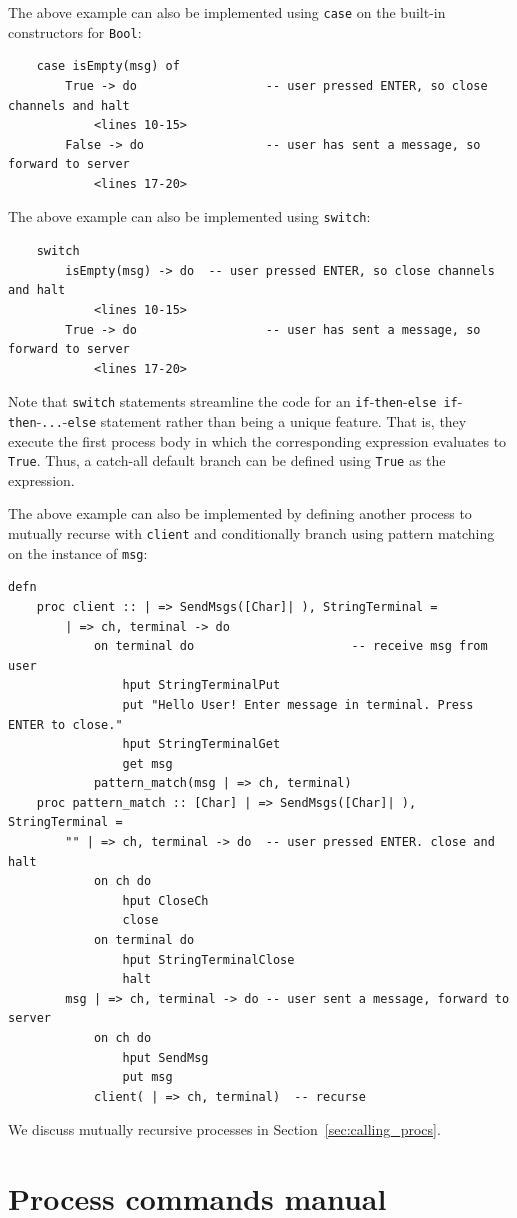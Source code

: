 \documentclass[acmsmall]{acmart}
\begin{document}
The above example can also be implemented using \lstinline$case$ on the built-in constructors for \lstinline{Bool}:
\begin{lstlisting}
	case isEmpty(msg) of
		True -> do					-- user pressed ENTER, so close channels and halt
			<lines 10-15>
		False -> do					-- user has sent a message, so forward to server
			<lines 17-20>
\end{lstlisting}

The above example can also be implemented using \lstinline$switch$:\begin{lstlisting}
	switch
		isEmpty(msg) -> do	-- user pressed ENTER, so close channels and halt
			<lines 10-15>
		True -> do					-- user has sent a message, so forward to server
			<lines 17-20>
\end{lstlisting}
Note that \lstinline$switch$ statements streamline the code for an \lstinline$if$-\lstinline$then$-\lstinline$else if$-\lstinline$then$-\lstinline$...$-\lstinline$else$ statement rather than being a unique feature.
That is, they execute the first process body in which the corresponding expression evaluates to \lstinline$True$.
Thus, a catch-all default branch can be defined using \lstinline$True$ as the expression.

The above example can also be implemented by defining another process to mutually recurse with \lstinline{client} and conditionally branch using pattern matching on the instance of \lstinline{msg}: 
\begin{lstlisting}[label=ex:pattern_matching, caption=Conditional branching using pattern matching]
defn
	proc client :: | => SendMsgs([Char]| ), StringTerminal =
		| => ch, terminal -> do
			on terminal do						-- receive msg from user
				hput StringTerminalPut
				put "Hello User! Enter message in terminal. Press ENTER to close."
				hput StringTerminalGet
				get msg
			pattern_match(msg | => ch, terminal)
	proc pattern_match :: [Char] | => SendMsgs([Char]| ), StringTerminal =
		"" | => ch, terminal -> do	-- user pressed ENTER. close and halt
			on ch do 
				hput CloseCh
				close 
			on terminal do
				hput StringTerminalClose	
				halt 
		msg | => ch, terminal -> do	-- user sent a message, forward to server
			on ch do											
				hput SendMsg
				put msg
			client( | => ch, terminal)	-- recurse 
\end{lstlisting}   
We discuss mutually recursive processes in Section~\ref{sec:calling_procs}.


\section{Process commands manual}
\label{sec:concurrent-operators}
\label{Sec:concurrent-commands}
\end{document}
